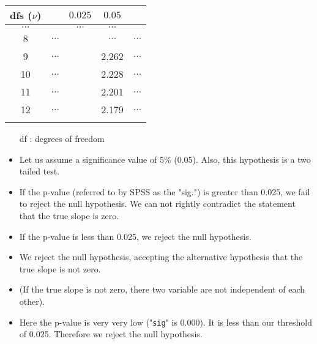 \documentclass[]{report}
\begin{document}
\begin{center}
	\begin{tabular}{|c||c|c|c|c|}
		\hline dfs ($\nu$) &  & $0.025$ & $0.05$ &  \\ \hline
		\hline $\ldots$ &  & $\ldots$ & $\ldots$ &  \\ 
		\hline 8 & $\ldots$ &  & $\ldots$  &  $\ldots$ \\ 
		\hline 9 & $\ldots$ &  & 2.262  &  $\ldots$ \\ 
		\hline 10 & $\ldots$ & & 2.228   & $\ldots$ \\ 
		\hline 11 & $\ldots$ & & 2.201    & $\ldots$ \\ 
		\hline 12 & $\ldots$ & & 2.179   & $\ldots$ \\ 
		\hline \phantom{spaces} & \phantom{spaces} & \phantom{spaces}  & \phantom{spaces} & \phantom{spaces} \\ 
		\hline 
	\end{tabular} 
\end{center}
\begin{itemize}
	\item[df] : degrees of freedom
\end{itemize}



\begin{itemize}
	\item Let us assume a significance value of 5\% (0.05). Also, this hypothesis is a two tailed test. 
	
	\item If the p-value (referred to by SPSS as the "sig.") is greater than 0.025, we fail to reject the null hypothesis. We can not rightly contradict the statement that the true slope is zero.
	
	\item If the p-value is less than 0.025, we reject the null hypothesis.
	
	\item We reject the null hypothesis, accepting the alternative hypothesis that the true slope is not zero.
	
	\item (If the true slope is not zero, there two variable are not independent of each other).
	
	\item Here the p-value is very very low ("\texttt{sig}"  is 0.000). It is less than our threshold of 0.025. Therefore we reject the null hypothesis.
\end{itemize}
\end{document}
